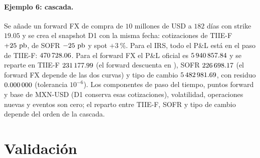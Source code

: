 \paragraph{Ejemplo 6: cascada.} Se añade un forward FX de compra de $10$ millones de USD a $182$ días con strike $19.05$ y se crea el snapshot D1 con la misma fecha: cotizaciones de TIIE-F $+25~\pb$, de SOFR $-25~\pb$ y spot $+3~\%$. Para el IRS, todo el P\&L está en el paso de TIIE-F: $\verif{cap09-explain-irs-tiie}{470728.06}$. Para el forward FX el P\&L oficial es $\verif{cap09-explain-fwd-pnl}{5940857.84}$ y se reparte en TIIE-F $\verif{cap09-explain-fwd-tiie}{231177.99}$ (el forward descuenta en \MXN), SOFR $\verif{cap09-explain-fwd-sofr}{226698.17}$ (el forward FX depende de las dos curvas) y tipo de cambio $\verif{cap09-explain-fwd-fx}{5482981.69}$, con residuo $\verif{cap09-explain-residuo}{0.000000}$ (tolerancia $10^{-6}$). Los componentes de paso del tiempo, puntos forward y base de MXN-USD (D1 conserva esas cotizaciones), volatilidad, operaciones nuevas y eventos son cero; el reparto entre TIIE-F, SOFR y tipo de cambio depende del orden de la cascada.

\section{Validación}\label{sec:cap09-validacion}

